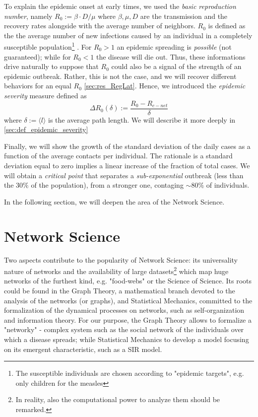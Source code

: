 \documentclass[a4paper,10pt,twoside]{book} %
\theoremstyle{definition}
\begin{document}
To explain the epidemic onset at early times, we used the \textit{basic reproduction number}, namely  $R_0 := \beta \cdot D/\mu$ where $ \beta, \mu, D$ are the transmission and the recovery rates alongside with the average number of neighbors. $ R_0 $  is defined as the the average number of new infections caused by an individual in a completely susceptible population\footnote{The susceptible individuals are chosen according to "epidemic targets", e.g. only children for the measles} \cite{Kiss::MathOfEpiOnNet}. For $R_0 > 1$ an epidemic spreading is \textit{possible} (not guaranteed); while for $R_0 < 1$ the disease will die out. 
Thus, these informations drive naturally to suppose that $R_0$ could also be a signal of the strength of an epidemic outbreak. Rather, this is not the case, and we will recover different behaviors for an equal $ R_0 $ \autoref{sec:res_RegLat}. Hence, we introduced the \textit{epidemic severity} measure defined as 
\begin{equation}
	\Delta R_0 (\delta):= \frac{R_0 - R_{c-net}}{\delta}
\end{equation}
where $\delta:=\langle l \rangle $ is the average path length. We will describe it more deeply in \autoref{sec:def_epidemic_severity}

Finally, we will show the growth of the standard deviation of the daily cases as a function of the average contacts per individual. The rationale is a standard deviation equal to zero implies a linear increase of the fraction of total cases. We will obtain a \textit{critical point} that separates a \textit{sub-exponential} outbreak (less than the $30\%$ of the population), from a stronger one, contaging $\sim 80\%$ of individuals.

In the following section, we will deepen the area of the Network Science.

\section{Network Science}

Two aspects contribute to the popularity of Network Science: its universality nature of networks and the availability of large datasets\footnote{In reality, also the computational power to analyze them should be remarked.} which map huge networks of the furthest kind, e.g. "food-webs" or the Science of Science.
Its roots could be found in the Graph Theory, a mathematical branch devoted to the analysis of the networks (or graphs), and Statistical Mechanics, committed to the formalization of the dynamical processes on networks, such as self-organization and information theory.
For our purpose, the Graph Theory allows to formalize a "networky" - complex system such as the social network of the individuals over which a disease spreads; while Statistical Mechanics to develop a model focusing on its emergent characteristic, such as a SIR model.
\end{document}
